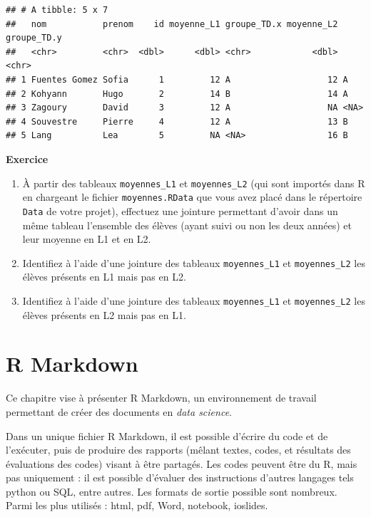 \documentclass[
  11pt,
]{book}
\providecommand{\tightlist}{%
  \setlength{\itemsep}{0pt}\setlength{\parskip}{0pt}}
\numberwithin{equation}{section}
\numberwithin{countremarque}{section}
\newenvironment{greenbox}{
  \begin{tcolorbox}[breakable, colback=vert,coltext=black,
                  colframe=grisfonce]}
 {\end{tcolorbox}}
\begin{document}
\begin{lstlisting}
## # A tibble: 5 x 7
##   nom           prenom    id moyenne_L1 groupe_TD.x moyenne_L2 groupe_TD.y
##   <chr>         <chr>  <dbl>      <dbl> <chr>            <dbl> <chr>      
## 1 Fuentes Gomez Sofia      1         12 A                   12 A          
## 2 Kohyann       Hugo       2         14 B                   14 A          
## 3 Zagoury       David      3         12 A                   NA <NA>       
## 4 Souvestre     Pierre     4         12 A                   13 B          
## 5 Lang          Lea        5         NA <NA>                16 B
\end{lstlisting}

\begin{greenbox}

\textbf{Exercice}

\begin{enumerate}
\def\labelenumi{\arabic{enumi}.}
\tightlist
\item
  À partir des tableaux \texttt{moyennes\_L1} et \texttt{moyennes\_L2} (qui sont importés dans R en chargeant le fichier \texttt{moyennes.RData} que vous avez placé dans le répertoire \texttt{Data} de votre projet), effectuez une jointure permettant d'avoir dans un même tableau l'ensemble des élèves (ayant suivi ou non les deux années) et leur moyenne en L1 et en L2.
\item
  Identifiez à l'aide d'une jointure des tableaux \texttt{moyennes\_L1} et \texttt{moyennes\_L2} les élèves présents en L1 mais pas en L2.
\item
  Identifiez à l'aide d'une jointure des tableaux \texttt{moyennes\_L1} et \texttt{moyennes\_L2} les élèves présents en L2 mais pas en L1.
\end{enumerate}

\end{greenbox}

\hypertarget{r-markdown}{%
\chapter{R Markdown}\label{r-markdown}}

Ce chapitre vise à présenter R Markdown, un environnement de travail permettant de créer des documents en \emph{data science}.

Dans un unique fichier R Markdown, il est possible d'écrire du code et de l'exécuter, puis de produire des rapports (mêlant textes, codes, et résultats des évaluations des codes) visant à être partagés. Les codes peuvent être du R, mais pas uniquement : il est possible d'évaluer des instructions d'autres langages tels python ou SQL, entre autres. Les formats de sortie possible sont nombreux. Parmi les plus utilisés : html, pdf, Word, notebook, ioslides.
\end{document}
